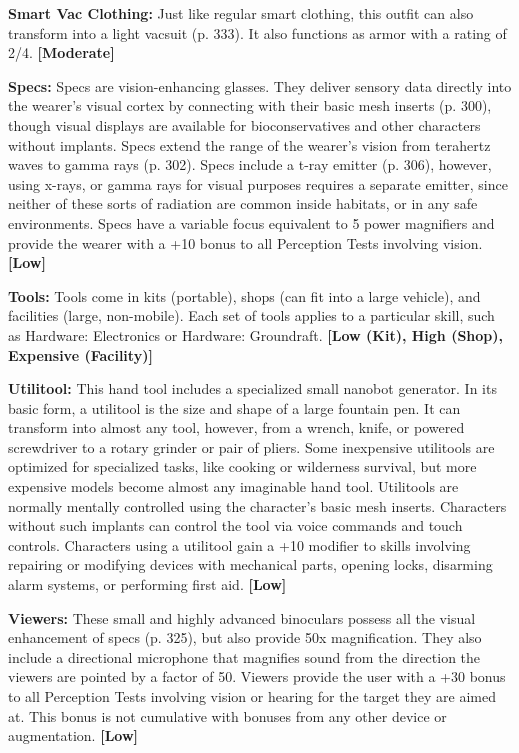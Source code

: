 \textbf{Smart Vac Clothing:} Just like regular smart clothing, this outfit can also transform into a light vacsuit (p. 333). It also functions as armor with a rating of 2/4. \textbf{[Moderate]} 

\textbf{Specs:} Specs are vision-enhancing glasses. They deliver sensory data directly into the wearer’s visual cortex by connecting with their basic mesh inserts (p. 300), though visual displays are available for bioconservatives and other characters without implants. Specs extend the range of the wearer’s vision from terahertz waves to gamma rays (p. 302). Specs include a t-ray emitter (p. 306), however, using x-rays, or gamma rays for visual purposes requires a separate emitter, since neither of these sorts of radiation are common inside habitats, or in any safe environments. Specs have a variable focus equivalent to 5 power magnifiers and provide the wearer with a +10 bonus to all Perception Tests involving vision. \textbf{[Low]} 

\textbf{Tools:} Tools come in kits (portable), shops (can fit into a large vehicle), and facilities (large, non-mobile). Each set of tools applies to a particular skill, such as Hardware: Electronics or Hardware: Groundraft. \textbf{[Low (Kit), High (Shop), Expensive (Facility)]} 

\textbf{Utilitool:} This hand tool includes a specialized small nanobot generator. In its basic form, a utilitool is the size and shape of a large fountain pen. It can transform into almost any tool, however, from a wrench, knife, or powered screwdriver to a rotary grinder or pair of pliers. Some inexpensive utilitools are optimized for specialized tasks, like cooking or wilderness survival, but more expensive models become almost any imaginable hand tool. Utilitools are normally mentally controlled using the character’s basic mesh inserts. Characters without such implants can control the tool via voice commands and touch controls. Characters using a utilitool gain a +10 modifier to skills involving repairing or modifying devices with mechanical parts, opening locks, disarming alarm systems, or performing first aid. \textbf{[Low]} 

\textbf{Viewers:} These small and highly advanced binoculars possess all the visual enhancement of specs (p. 325), but also provide 50x magnification. They also include a directional microphone that magnifies sound from the direction the viewers are pointed by a factor of 50. Viewers provide the user with a +30 bonus to all Perception Tests involving vision or hearing for the target they are aimed at. This bonus is not cumulative with bonuses from any other device or augmentation. \textbf{[Low]} 



